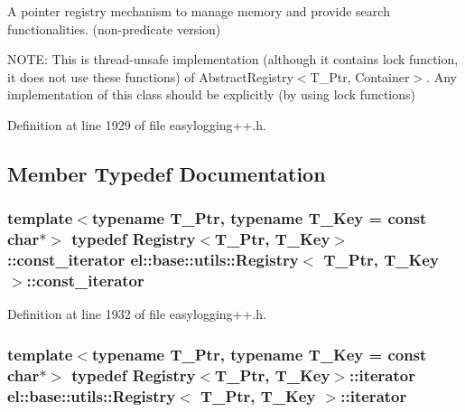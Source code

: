 A pointer registry mechanism to manage memory and provide search functionalities. (non-\/predicate version) 

N\+O\+T\+E\+: This is thread-\/unsafe implementation (although it contains lock function, it does not use these functions) of Abstract\+Registry$<$\+T\+\_\+\+Ptr, Container$>$. Any implementation of this class should be explicitly (by using lock functions) 

Definition at line 1929 of file easylogging++.\+h.



\subsection{Member Typedef Documentation}
\hypertarget{classel_1_1base_1_1utils_1_1_registry_a955e62adc74c60d0205b52a3fc430cef}{}
\subsubsection[{const\+\_\+iterator}]{\setlength{\rightskip}{0pt plus 5cm}template$<$typename T\+\_\+\+Ptr, typename T\+\_\+\+Key = const char$\ast$$>$ typedef {\bf Registry}$<$T\+\_\+\+Ptr, T\+\_\+\+Key$>$\+::{\bf const\+\_\+iterator} {\bf el\+::base\+::utils\+::\+Registry}$<$ T\+\_\+\+Ptr, T\+\_\+\+Key $>$\+::{\bf const\+\_\+iterator}}\label{classel_1_1base_1_1utils_1_1_registry_a955e62adc74c60d0205b52a3fc430cef}


Definition at line 1932 of file easylogging++.\+h.

\hypertarget{classel_1_1base_1_1utils_1_1_registry_a31f3d725285e6b65f1f9e990066f96ed}{}
\subsubsection[{iterator}]{\setlength{\rightskip}{0pt plus 5cm}template$<$typename T\+\_\+\+Ptr, typename T\+\_\+\+Key = const char$\ast$$>$ typedef {\bf Registry}$<$T\+\_\+\+Ptr, T\+\_\+\+Key$>$\+::{\bf iterator} {\bf el\+::base\+::utils\+::\+Registry}$<$ T\+\_\+\+Ptr, T\+\_\+\+Key $>$\+::{\bf iterator}}\label{classel_1_1base_1_1utils_1_1_registry_a31f3d725285e6b65f1f9e990066f96ed}


